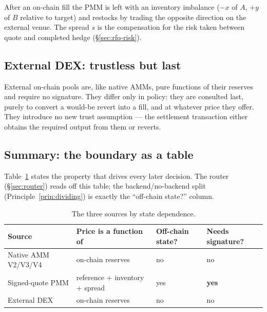 After an on-chain fill the PMM is left with an inventory imbalance ($-x$
of $A$, $+y$ of $B$ relative to target) and restocks by trading the
opposite direction on the external venue. The spread $s$ is the
compensation for the risk taken between quote and completed hedge
(\S\ref{sec:rfq-risk}).

\subsection{External DEX: trustless but last}

External on-chain pools are, like native AMMs, pure functions of their
reserves and require no signature. They differ only in policy: they are
consulted last, purely to convert a would-be revert into a fill, and at
whatever price they offer. They introduce no new trust assumption ---
the settlement transaction either obtains the required output from them
or reverts.

\subsection{Summary: the boundary as a table}

Table~\ref{tab:sources} states the property that drives every later
decision. The router (\S\ref{sec:router}) reads off this table; the
backend/no-backend split (Principle~\ref{prin:dividing}) is exactly the
``off-chain state?'' column.

\begin{table}[h]
\centering
\caption{The three sources by state dependence.}
\label{tab:sources}
\small
\begin{tabular}{@{}llll@{}}
\toprule
Source & Price is a function of & Off-chain state? & Needs signature? \\
\midrule
Native AMM V2/V3/V4 & on-chain reserves & no  & no \\
Signed-quote PMM    & reference + inventory + spread & yes & \textbf{yes} \\
External DEX        & on-chain reserves & no  & no \\
\bottomrule
\end{tabular}
\end{table}

